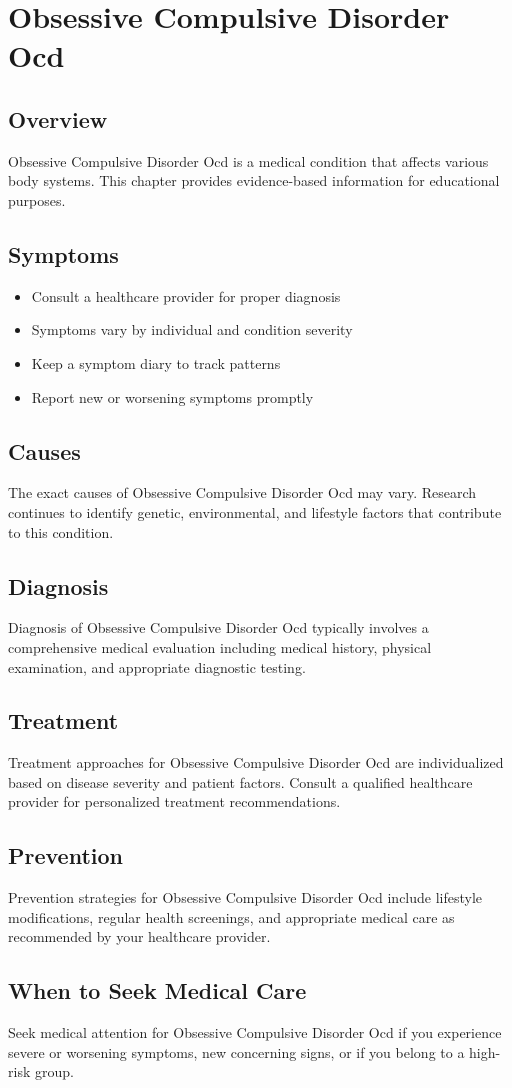 \chapter{Obsessive Compulsive Disorder Ocd}

\section*{Overview}
Obsessive Compulsive Disorder Ocd is a medical condition that affects various body systems. This chapter provides evidence-based information for educational purposes.

\section*{Symptoms}
\begin{itemize}
  \item Consult a healthcare provider for proper diagnosis
  \item Symptoms vary by individual and condition severity
  \item Keep a symptom diary to track patterns
  \item Report new or worsening symptoms promptly
\end{itemize}

\section*{Causes}
The exact causes of Obsessive Compulsive Disorder Ocd may vary. Research continues to identify genetic, environmental, and lifestyle factors that contribute to this condition.

\section*{Diagnosis}
Diagnosis of Obsessive Compulsive Disorder Ocd typically involves a comprehensive medical evaluation including medical history, physical examination, and appropriate diagnostic testing.

\section*{Treatment}
Treatment approaches for Obsessive Compulsive Disorder Ocd are individualized based on disease severity and patient factors. Consult a qualified healthcare provider for personalized treatment recommendations.

\section*{Prevention}
Prevention strategies for Obsessive Compulsive Disorder Ocd include lifestyle modifications, regular health screenings, and appropriate medical care as recommended by your healthcare provider.

\section*{When to Seek Medical Care}
Seek medical attention for Obsessive Compulsive Disorder Ocd if you experience severe or worsening symptoms, new concerning signs, or if you belong to a high-risk group.
\clearpage
